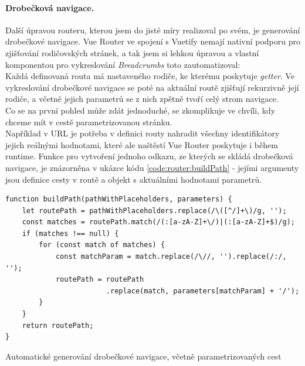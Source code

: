 \paragraph{Drobečková navigace.} Další úpravou routeru, kterou jsem do jisté míry realizoval po svém, je generování drobečkové navigace. Vue Router ve spojení s Vuetify nemají nativní podporu pro zjišťování rodičovských stránek, a tak jsem si lehkou úpravou a vlastní komponentou pro vykreslování \emph{Breadcrumbs} toto zautomatizoval:\\
Každá definovaná routa má nastaveného rodiče, ke kterému poskytuje \emph{getter}. Ve vykreslování drobečkové navigace se poté na aktuální routě zjišťují rekurzivně její rodiče, a včetně jejich parametrů se z nich zpětně tvoří celý strom navigace.\\
Co se na první pohled může zdát jednoduché, se zkomplikuje ve chvíli, kdy chceme mít v cestě parametrizovanou stránku.\\
Například v URL  je potřeba v definici routy nahradit všechny identifikátory jejich reálnými hodnotami, které ale naštěstí Vue Router poskytuje i během runtime. Funkce pro vytvoření jednoho odkazu, ze kterých se skládá drobečková navigace, je znázorněna v ukázce kódu \ref{code:router:buildPath} - jejími argumenty jsou definice cesty v routě a objekt s aktuálními hodnotami parametrů.

\begin{listing}[H]
    \begin{verbatim}
function buildPath(pathWithPlaceholders, parameters) {
    let routePath = pathWithPlaceholders.replace(/\([^/]+\)/g, '');
    const matches = routePath.match(/(:[a-zA-Z]+\/)|(:[a-zA-Z]+$)/g);
    if (matches !== null) {
        for (const match of matches) {
            const matchParam = match.replace(/\//, '').replace(/:/, '');
            routePath = routePath
                        .replace(match, parameters[matchParam] + '/');
        }
    }
    return routePath;
}
\end{verbatim}
\caption{Automatické generování drobečkové navigace, včetně parametrizovaných cest} \label{code:router:buildPath}
\end{listing}


